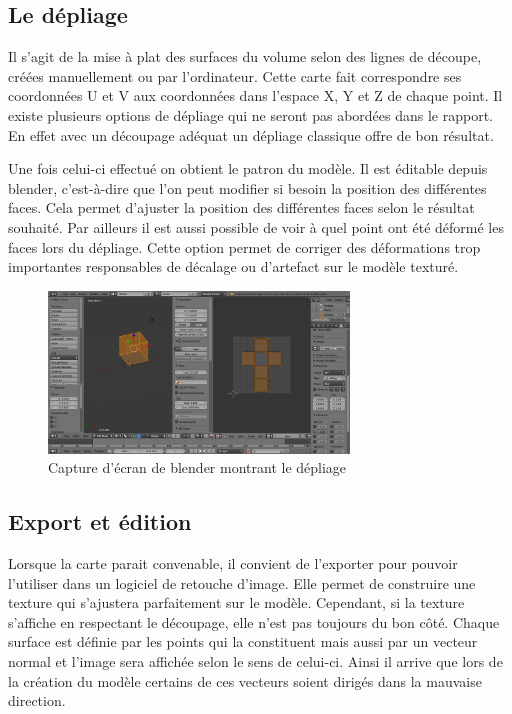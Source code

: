 \documentclass[11pt]{report}
\begin{document}
\subsection{Le dépliage}

Il s’agit de la mise à plat des surfaces du volume selon des lignes de découpe, créées manuellement ou par l’ordinateur. Cette carte fait correspondre ses coordonnées U et V aux coordonnées dans l’espace X, Y et Z de chaque point. Il existe plusieurs options de dépliage qui ne seront pas abordées dans le rapport. En effet avec un découpage adéquat un dépliage classique offre de bon résultat. 

Une fois celui-ci effectué on obtient le patron du modèle. Il est éditable depuis blender, c’est-à-dire que l’on peut modifier si besoin la position des différentes faces. Cela permet d’ajuster la position des différentes faces selon le résultat souhaité. Par ailleurs il est aussi possible de voir à quel point ont été déformé les faces lors du dépliage. Cette option permet de corriger des déformations trop importantes responsables de décalage ou d’artefact sur le modèle texturé.

\begin{figure}[htbp]
\centering
\includegraphics[width=8cm]{unwrap.png}
\caption{Capture d'écran de blender montrant le dépliage}
\end{figure}

\subsection{Export et édition}

Lorsque la carte parait convenable, il convient de l’exporter pour pouvoir l’utiliser dans un logiciel de retouche d’image. Elle permet de construire une texture qui s’ajustera parfaitement sur le modèle.  Cependant, si la texture s’affiche en respectant le découpage, elle n’est pas toujours du bon côté. Chaque surface est définie par les points qui la constituent mais aussi par un vecteur normal et l’image sera affichée selon le sens de celui-ci. Ainsi il arrive que lors de la création du modèle certains de ces vecteurs soient dirigés dans la mauvaise direction.
\end{document}
